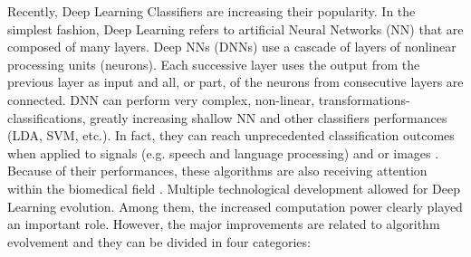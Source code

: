 \documentclass[12pt]{iopart}
\begin{document}
Recently, Deep Learning Classifiers are increasing their popularity. In the simplest fashion, Deep Learning  refers to artificial Neural Networks (NN) \parencite{lecun2015deep, schmidhuber2015deep} that are composed of many layers. Deep NNs (DNNs) use a cascade of  layers of nonlinear processing units (neurons). Each successive layer uses the output from the previous layer as input and all, or part, of the neurons from consecutive layers are connected. DNN can perform very complex, non-linear, transformations-classifications, greatly increasing shallow NN  \parencite{bianchini2014complexity}  and other classifiers performances (LDA, SVM, etc.). In fact, they can reach unprecedented classification outcomes when applied to signals (e.g. speech and language processing) and or images \parencite{simonyan2014very, hinton2012deep, collobert2008unified, krizhevsky2012imagenet}. Because of their performances, these algorithms are also receiving  attention within the biomedical field \parencite{ronneberger2015u, hudson2000neural, ciresan2012deep}. 
Multiple technological development allowed for Deep Learning evolution. 
Among them, the increased computation power clearly played an important role.
However, the major improvements are  related to algorithm evolvement and they can be divided in four  categories:
\end{document}
